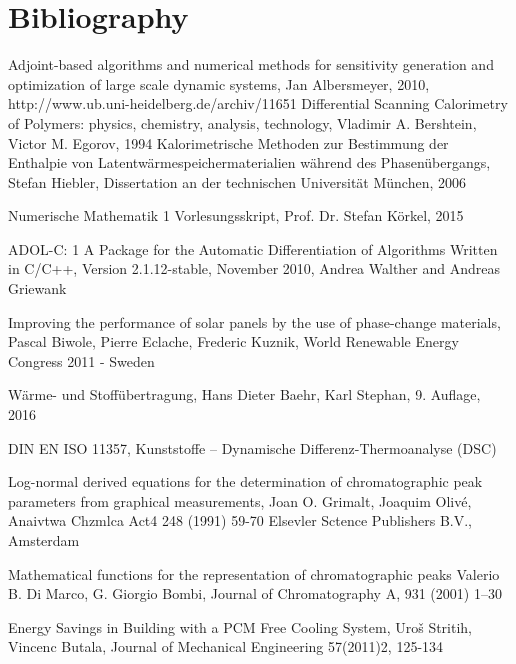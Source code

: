 \documentclass{scrartcl}[12pt, halfparskip]
\numberwithin{equation}{section}
\numberwithin{figure}{section}
\numberwithin{table}{section}
\begin{document}
\newpage
\section{Bibliography}

\begin{thebibliography}{9}

	 Adjoint-based algorithms and numerical methods for sensitivity generation and optimization of large scale dynamic systems, 
	 Jan Albersmeyer, 2010,
	 http://www.ub.uni-heidelberg.de/archiv/11651
	Differential Scanning Calorimetry of Polymers: physics, chemistry, analysis, technology,
	Vladimir A. Bershtein, Victor M. Egorov,
	1994
	Kalorimetrische Methoden zur Bestimmung
	der Enthalpie von Latentwärmespeichermaterialien
	während des Phasenübergangs,
	Stefan Hiebler, Dissertation an der technischen Universität München, 2006
	
	Numerische Mathematik 1 Vorlesungsskript, 
	Prof. Dr. Stefan Körkel, 2015

	ADOL-C: 1
	A Package for the Automatic Differentiation
	of Algorithms Written in C/C++,
	Version 2.1.12-stable, November 2010,
	Andrea Walther and Andreas Griewank
	
	Improving the performance of solar panels by the use of phase-change materials,
	Pascal Biwole, Pierre Eclache, Frederic Kuznik,
	World Renewable Energy Congress 2011 - Sweden
	
	Wärme- und Stoffübertragung,
	Hans Dieter Baehr, Karl Stephan,
	9. Auflage, 2016
	
	DIN EN ISO 11357, 
	Kunststoffe –
	Dynamische Differenz-Thermoanalyse (DSC)
	
	Log-normal derived equations for the determination
	of chromatographic peak parameters
	from graphical measurements,
	Joan O. Grimalt, Joaquim Olivé,
	Anaivtwa Chzmlca Act4 248 (1991) 59-70
	Elsevler Sctence Publishers B.V., Amsterdam
	
	Mathematical functions for the representation of chromatographic
	peaks
	Valerio B. Di Marco, G. Giorgio Bombi,
	Journal of Chromatography A, 931 (2001) 1–30
	
	Energy Savings in Building with a PCM Free Cooling System,
	Uroš Stritih, Vincenc Butala,
	Journal of Mechanical Engineering 57(2011)2, 125-134	
	

\end{thebibliography}
\end{document}
